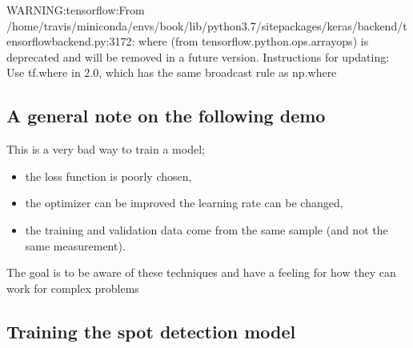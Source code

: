 \documentclass[letterpaper,10pt,english]{sphinxmanual}
\begin{document}
\begin{sphinxVerbatim}[commandchars=\\\{\}]
WARNING:tensorflow:From /home/travis/miniconda/envs/book/lib/python3.7/site\PYGZhy{}packages/keras/backend/tensorflow\PYGZus{}backend.py:3172: where (from tensorflow.python.ops.array\PYGZus{}ops) is deprecated and will be removed in a future version.
Instructions for updating:
Use tf.where in 2.0, which has the same broadcast rule as np.where
\end{sphinxVerbatim}


\subsection{A general note on the following demo}
\label{\detokenize{ML4NeutronImageSegmentation:a-general-note-on-the-following-demo}}
This is a very bad way to train a model;
\begin{itemize}
\item {} 
the loss function is poorly chosen,

\item {} 
the optimizer can be improved the learning rate can be changed,

\item {} 
the training and validation data  come from the same sample (and  not the same measurement).

\end{itemize}

The goal is to be aware of these techniques and have a feeling for how they can work for complex problems


\subsection{Training the spot detection model}
\label{\detokenize{ML4NeutronImageSegmentation:training-the-spot-detection-model}}
\begin{sphinxVerbatim}[commandchars=\\\{\}]
   
                           
                            
\end{sphinxVerbatim}
\end{document}
